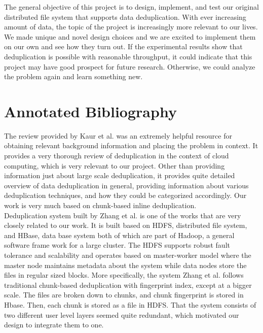 \documentclass[11pt]{article}
\begin{document}
The general objective of this project is to design, implement, and test our original distributed file system that supports data deduplication. With ever increasing amount of data, the topic of the project is increasingly more relevant to our lives. We made unique and novel design choices and we are excited to implement them on our own and see how they turn out. If the experimental results show that deduplication is possible with reasonable throughput, it could indicate that this project may have good prospect for future research. Otherwise, we could analyze the problem again and learn something new.




\newpage

\onecolumn
\section*{Annotated Bibliography}\label{annon}



The review provided by Kaur et al. was an extremely helpful resource for obtaining relevant background information and placing the problem in context\cite{Overview}. It provides a very thorough review of deduplication in the context of cloud computing, which is very relevant to our project. Other than providing information just about large scale deduplication, it provides quite detailed overview of data deduplication in general, providing information about various deduplication techniques, and how they could be categorized accordingly. Our work is very much based on chunk-based inline deduplication.\\

Deduplication system built by Zhang et al. is one of the works that are very closely related to our work\cite{HDFSDe}. It is built based on HDFS, distributed file system, and HBase, data base system both of which are part of Hadoop, a general software frame work for a large cluster. The HDFS supports robust fault tolerance and scalability and operates based on master-worker model where the master node maintains metadata about the system while data nodes store the files in regular sized blocks. More specifically, the system Zhang et al. follows traditional chunk-based deduplication with fingerprint index, except at a bigger scale. The files are broken down to chunks, and chunk fingerprint is stored in Hbase. Then, each chunk is stored as a file in HDFS. That the system consists of two different user level layers seemed quite redundant, which motivated our design to integrate them to one.\\
\end{document}
